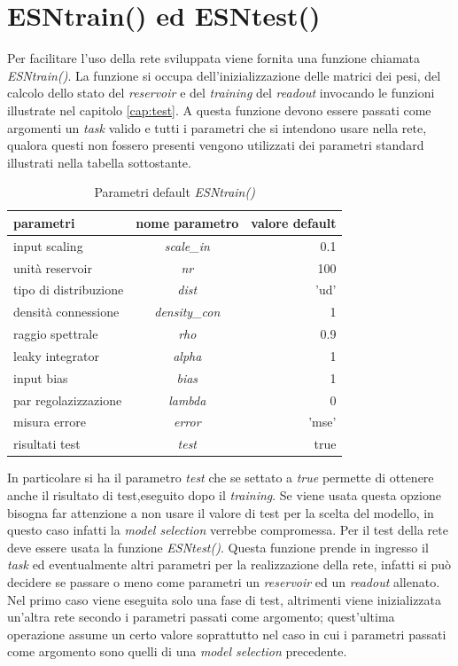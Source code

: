 \section{ESNtrain() ed ESNtest()}
Per facilitare l'uso della rete sviluppata viene fornita una funzione chiamata \textit{ESNtrain()}. La funzione si occupa dell'inizializzazione delle matrici dei pesi, del calcolo dello stato del \textit{reservoir} e del \textit{training} del \textit{readout} invocando le funzioni illustrate nel capitolo \ref{cap:test}. A questa funzione devono essere passati come argomenti un \textit{task} valido e tutti i parametri che si intendono usare nella rete, qualora questi non fossero presenti vengono utilizzati dei parametri standard illustrati nella tabella sottostante.
\begin{table}[h]
	\begin{center}
	 \begin{tabular}{|l|c|r|}
	 	\hline
	 	\textbf{parametri}		&\textbf{nome parametro}&   \textbf{valore default}\\
	 	\hline
	 	input scaling			&  \textit{scale\_in}	&   0.1\\
	 	\hline
	 	unità reservoir 		&  \textit{nr}          &   100\\
	 	\hline
	 	tipo di distribuzione	&  \textit{dist}        &   'ud'\\
	 	\hline
	 	densità connessione		&  \textit{density\_con}&   1\\
	 	\hline
	 	raggio spettrale		&  \textit{rho}			&   0.9\\
	 	\hline
	 	leaky integrator		&  \textit{alpha}		&   1\\
	 	\hline
	 	input bias				&  \textit{bias}		&   1\\
	 	\hline
	 	par regolazizzazione	&  \textit{lambda}		&   0\\
	 	\hline
	 	misura errore			&  \textit{error}		&   'mse'\\
	 	\hline
	 	risultati test			&  \textit{test}		&   true\\
	 	\hline
	 \end{tabular}
	\end{center}
	\caption{Parametri default \textit{ESNtrain()}}
\end{table}

In particolare si ha il parametro \textit{test} che se settato a \textit{true} permette di ottenere anche il risultato di test,eseguito dopo il \textit{training}. Se viene usata questa opzione bisogna far attenzione a non usare il valore di test per la scelta del modello, in questo caso infatti la \textit{model selection} verrebbe compromessa. Per il test della rete deve essere usata la funzione \textit{ESNtest()}. Questa funzione prende in ingresso il \textit{task} ed eventualmente altri parametri per la realizzazione della rete, infatti si può decidere se passare o meno come parametri un \textit{reservoir} ed un \textit{readout} allenato. Nel primo caso viene eseguita solo una fase di test, altrimenti viene inizializzata un'altra rete secondo i parametri passati come argomento; quest'ultima operazione assume un certo valore soprattutto nel caso in cui i parametri passati come argomento sono quelli di una \textit{model selection} precedente.

